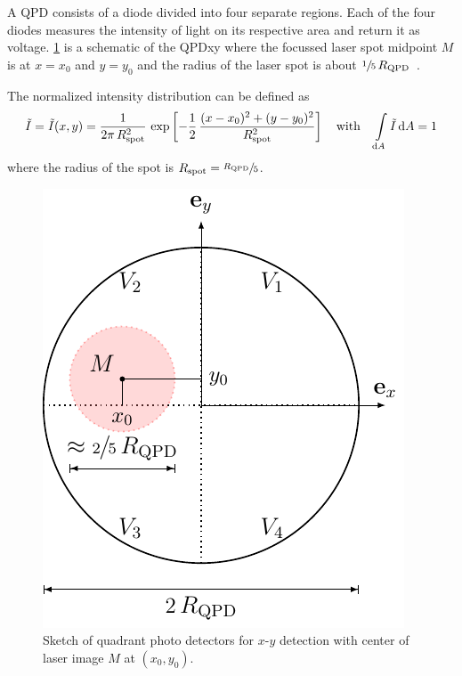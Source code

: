 A QPD consists of a diode divided into four separate regions. Each of the four 
diodes measures the intensity of light on its respective area and return it as 
voltage. \cref{fig:Th-QPD} is a schematic of the QPDxy where the focussed laser 
spot midpoint $M$ is at $x=x_{0}$ and $y=y_{0}$ and the radius of the laser 
spot is about $\sfrac{1}{5}\,R_{\mathrm{QPD}}$~\cite{Lamprecht2017}.

The normalized intensity distribution can be defined as
\begin{equation}
  \tilde{I} = \tilde{I}(x, y) = 
  \frac{1}{2\pi\,R_{\mathrm{spot}}^{2}}\,\exp\left[ 
  -\frac{1}{2}\,\frac{(x-x_{0})^{2} + (y - y_{0})^{2}}{R_{\mathrm{spot}}^{2}} 
\right]
  \quad \text{with}\quad\int\limits_{\dd{A}}\tilde{I}\dd{A} = 1
    \label{eq:Th-intensity}
\end{equation}
where the radius of the spot is $R_{\mathrm{spot}}=\sfrac{R_{\mathrm{QPD}}}{5}$.

\begin{figure}[tbp]
  \centering
  \includegraphics[]{Plots/cache/QPD.pdf}
  \caption{Sketch of quadrant photo detectors for $x$-$y$ detection with center 
  of laser image $M$ at $(x_{0}, y_{0})$.}
  \label{fig:Th-QPD}
\end{figure}

